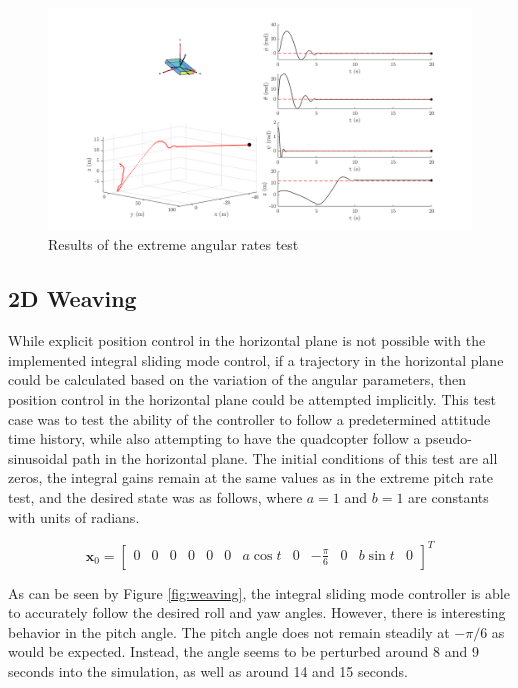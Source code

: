 \documentclass[12pt]{article}
\begin{document}
\begin{center}
\begin{figure}[H]
\captionsetup{width=1\textwidth}
\centering
\includegraphics[width=1\textwidth]{crazyPitchRate.png}
\caption{\label{fig:crazyPitchRate}Results of the extreme angular rates test}
\end{figure}
\end{center}

\subsection{2D Weaving}
While explicit position control in the horizontal plane is not possible with the implemented integral sliding mode control, if a trajectory in the horizontal plane could be calculated based on the variation of the angular parameters, then position control in the horizontal plane could be attempted implicitly. This test case was to test the ability of the controller to follow a predetermined attitude time history, while also attempting to have the quadcopter follow a pseudo-sinusoidal path in the horizontal plane. The initial conditions of this test are all zeros, the integral gains remain at the same values as in the extreme pitch rate test, and the desired state was as follows, where $a=1$ and $b=1$ are constants with units of radians.

\begin{equation}
\bm x_0 = \begin{bmatrix}
0 & 0 & 0 & 0 & 0 & 0 & a\cos t & 0 & -\frac{\pi}{6}& 0 & b\sin t & 0
\end{bmatrix}^T
\end{equation}

As can be seen by Figure \ref{fig:weaving}, the integral sliding mode controller is able to accurately follow the desired roll and yaw angles. However, there is interesting behavior in the pitch angle. The pitch angle does not remain steadily at $-\pi/6$ as would be expected. Instead, the angle seems to be perturbed around 8 and 9 seconds into the simulation, as well as around 14 and 15 seconds. 
\end{document}
